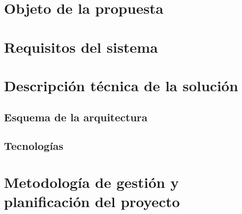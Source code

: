 \documentclass[11pt,spanish]{article}
\begin{document}
\section{Objeto de la propuesta}



\section{Requisitos del sistema}



\section{Descripción técnica de la solución}


\subsection{Esquema de la arquitectura}


\subsection{Tecnologías}



\section{Metodología de gestión y planificación del proyecto}

\end{document}
